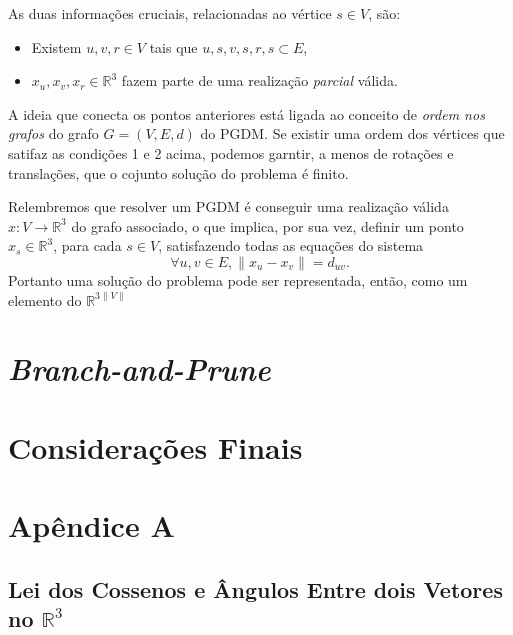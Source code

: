 \documentclass[a4paper,12pt]{article}
\begin{document}
	As duas informações cruciais, relacionadas ao vértice $s\in V$, são:
	\begin{itemize}
		\item Existem $u, v, r \in V$ tais que ${u, s}, {v, s}, {r, s}\subset E$,
		\item $x_{u}, x_{v}, x_{r} \in\mathbb{R}^{3}$ fazem parte de uma realização \textit{parcial} válida. 
	\end{itemize}
	
	A ideia que conecta os pontos anteriores está ligada ao conceito de \textit{ordem nos grafos} do grafo $G = (V, E, d)$ do PGDM. Se existir uma ordem dos vértices que satifaz as condições 1 e 2 acima, podemos garntir, a menos de rotações e translações, que o cojunto solução do problema é finito.
	
	Relembremos que resolver um PGDM é conseguir uma realização válida $x: V \rightarrow\mathbb{R}^{3}$ do grafo associado, o que implica, por sua vez, definir um ponto $x_{s}\in\mathbb{R}^3$, para cada $s\in V$, satisfazendo todas as equações do sistema
	$$
	\forall {u, v}\in E, \|x_{u} - x_{v}\| = d_{uv}.
	$$
	Portanto uma solução do problema pode ser representada, então, como um elemento do $\mathbb{R}^{3\|V\|}$
	
	\newpage
	\section{\textit{Branch-and-Prune}}
	
	\newpage
	\section{Considerações Finais}
	
	\newpage
	
	
	
	
	
	\newpage
	
	\section*{Apêndice A}
	\subsection*{Lei dos Cossenos e Ângulos Entre dois Vetores no $\mathbb{R}^3$}
	
\end{document}
